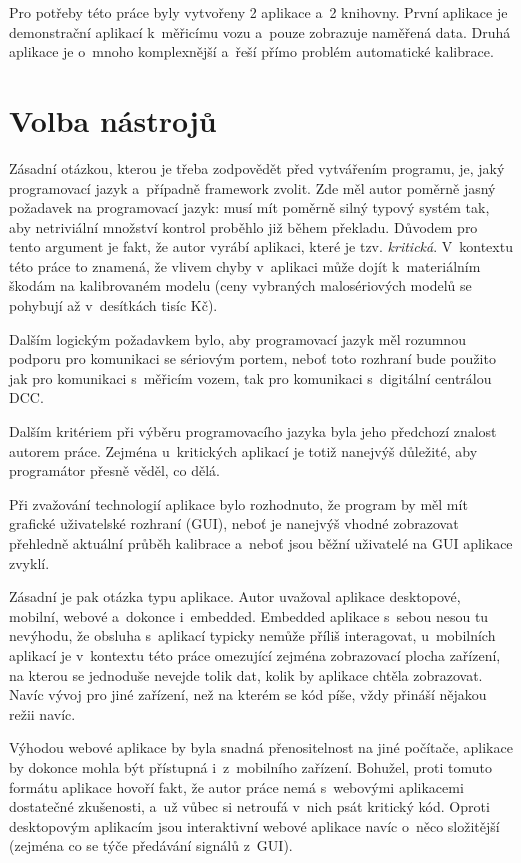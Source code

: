 Pro potřeby této práce byly vytvořeny 2 aplikace a~2 knihovny. První aplikace
je demonstrační aplikací k~měřicímu vozu a~pouze zobrazuje naměřená data. Druhá
aplikace je o~mnoho komplexnější a~řeší přímo problém automatické kalibrace.

\section{Volba nástrojů}
\label{sec:sw-nastroje}

Zásadní otázkou, kterou je třeba zodpovědět před vytvářením programu, je,
jaký programovací jazyk a~případně framework zvolit. Zde měl autor poměrně
jasný požadavek na programovací jazyk: musí mít poměrně silný typový
systém tak, aby netriviální množství kontrol proběhlo již během překladu.
Důvodem pro tento argument je fakt, že autor vyrábí aplikaci, které je tzv.
\textit{kritická}. V~kontextu této práce to znamená, že vlivem chyby
v~aplikaci může dojít k~materiálním škodám na kalibrovaném modelu (ceny
vybraných malosériových modelů se pohybují až v~desítkách tisíc Kč).

Dalším logickým požadavkem bylo, aby programovací jazyk měl rozumnou podporu
pro komunikaci se sériovým portem, neboť toto rozhraní bude použito jak pro
komunikaci s~měřicím vozem, tak pro komunikaci s~digitální centrálou \gls{DCC}.

Dalším kritériem při výběru programovacího jazyka byla jeho předchozí znalost
autorem práce. Zejména u~kritických aplikací je totiž nanejvýš důležité, aby
programátor přesně věděl, co dělá.

Při zvažování technologií aplikace bylo rozhodnuto, že program by měl
mít grafické uživatelské rozhraní (GUI), neboť je nanejvýš vhodné zobrazovat
přehledně aktuální průběh kalibrace a~neboť jsou běžní uživatelé na GUI
aplikace zvyklí.

Zásadní je pak otázka typu aplikace. Autor uvažoval aplikace desktopové,
mobilní, webové a~dokonce i~embedded. Embedded aplikace s~sebou nesou tu
nevýhodu, že obsluha s~aplikací typicky nemůže příliš interagovat, u~mobilních
aplikací je v~kontextu této práce omezující zejména zobrazovací plocha
zařízení, na kterou se jednoduše nevejde tolik dat, kolik by aplikace chtěla
zobrazovat. Navíc vývoj pro jiné zařízení, než na kterém se kód píše, vždy
přináší nějakou režii navíc.

Výhodou webové aplikace by byla snadná přenositelnost na jiné počítače,
aplikace by dokonce mohla být přístupná i~z~mobilního zařízení. Bohužel, proti
tomuto formátu aplikace hovoří fakt, že autor práce nemá s~webovými aplikacemi
dostatečné zkušenosti, a~už vůbec si netroufá v~nich psát kritický kód.
Oproti desktopovým aplikacím jsou interaktivní webové aplikace navíc o~něco
složitější (zejména co se týče předávání signálů z~GUI).

